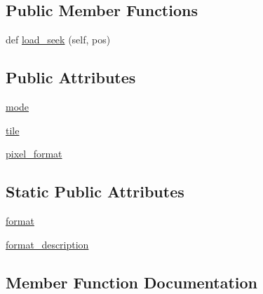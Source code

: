 \subsection*{Public Member Functions}
\begin{DoxyCompactItemize}
\item 
def \hyperlink{classPIL_1_1DdsImagePlugin_1_1DdsImageFile_ac57b24ed80896a06d5dda6b8fa489cee}{load\+\_\+seek} (self, pos)
\end{DoxyCompactItemize}
\subsection*{Public Attributes}
\begin{DoxyCompactItemize}
\item 
\hyperlink{classPIL_1_1DdsImagePlugin_1_1DdsImageFile_ac86664838648d6d30d81619a750d20da}{mode}
\item 
\hyperlink{classPIL_1_1DdsImagePlugin_1_1DdsImageFile_a7981797c91eb56ae98533888552cd0f5}{tile}
\item 
\hyperlink{classPIL_1_1DdsImagePlugin_1_1DdsImageFile_a3165e21d4fc3f7121227a05e60805683}{pixel\+\_\+format}
\end{DoxyCompactItemize}
\subsection*{Static Public Attributes}
\begin{DoxyCompactItemize}
\item 
\hyperlink{classPIL_1_1DdsImagePlugin_1_1DdsImageFile_a642e2c3409898b79c1c007cb0abf2c29}{format}
\item 
\hyperlink{classPIL_1_1DdsImagePlugin_1_1DdsImageFile_a3c715d3218b6b99fad1b6b1e011c2b7b}{format\+\_\+description}
\end{DoxyCompactItemize}


\subsection{Member Function Documentation}
\mbox{\label{classPIL_1_1DdsImagePlugin_1_1DdsImageFile_ac57b24ed80896a06d5dda6b8fa489cee}} 
